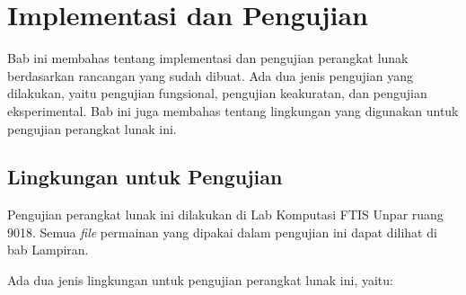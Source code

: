 \chapter{Implementasi dan Pengujian}
\label{chap:implementasipengujian}

Bab ini membahas tentang implementasi dan pengujian perangkat lunak berdasarkan rancangan yang sudah dibuat. Ada dua jenis pengujian yang dilakukan, yaitu pengujian fungsional, pengujian keakuratan, dan pengujian eksperimental. Bab ini juga membahas tentang lingkungan yang digunakan untuk pengujian perangkat lunak ini.

\section{Lingkungan untuk Pengujian}
\label{sec:lingkunganpengujian}

Pengujian perangkat lunak ini dilakukan di Lab Komputasi FTIS Unpar ruang 9018. Semua \textit{file} permainan yang dipakai dalam pengujian ini dapat dilihat di bab Lampiran. 

Ada dua jenis lingkungan untuk pengujian perangkat lunak ini, yaitu:

